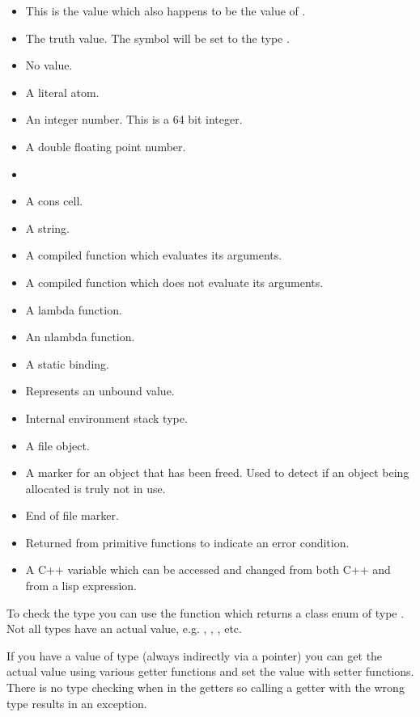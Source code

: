 \begin{itemize}
  \item[\cpp{NIL}] This is the value  which also happens to be the
     value of .
  \item[\cpp{T}] The truth value. The symbol  will be set to the type
    .
  \item[\cpp{EMPTY}] No value.
  \item[\cpp{SYMBOL}] A literal atom.
  \item[\cpp{INTEGER}] An integer number. This is a 64 bit integer.
  \item[\cpp{FLOAT}] A double floating point number.
  \item[\cpp{INDIRECT}]
  \item[\cpp{CONS}] A cons cell.
  \item[\cpp{STRING}] A string.
  \item[\cpp{SUBR}] A compiled function which evaluates its
    arguments.
  \item[\cpp{FSUBR}] A compiled function which does not evaluate its
    arguments.
  \item[\cpp{LAMBDA}] A lambda function.
  \item[\cpp{NLAMBDA}] An nlambda function.
  \item[\cpp{CLOSURE}] A static binding.
  \item[\cpp{UNBOUND}] Represents an unbound value.
  \item[\cpp{ENVIRON}] Internal environment stack type.
  \item[\cpp{FILET}] A file object.
  \item[\cpp{FREE}] A marker for an object that has been freed. Used to
    detect if an object being allocated is truly not in use.
  \item[\cpp{ENDOFFILE}] End of file marker.
  \item[\cpp{ERROR}] Returned from primitive functions to indicate an
    error condition.
  \item[\cpp{CVARIABLE}] A \textsf{C++} variable which can be accessed
    and changed from both \textsf{C++} and from a lisp expression.
\end{itemize}

To check the type you can use the  function which
returns a class enum of type . Not all types have an
actual value, e.g. , , , etc.

If you have a value of type  (always indirectly via a
 pointer) you can get the actual value using various getter
functions and set the value with setter functions. There is no type
checking when in the getters so calling a getter with the wrong type
results in an exception.

